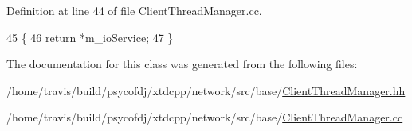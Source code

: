 Definition at line 44 of file Client\-Thread\-Manager.\-cc.


\begin{DoxyCode}
45 \{
46   \textcolor{keywordflow}{return} *m\_ioService;
47 \}
\end{DoxyCode}


The documentation for this class was generated from the following files\-:\begin{DoxyCompactItemize}
\item 
/home/travis/build/psycofdj/xtdcpp/network/src/base/\hyperlink{ClientThreadManager_8hh}{Client\-Thread\-Manager.\-hh}\item 
/home/travis/build/psycofdj/xtdcpp/network/src/base/\hyperlink{ClientThreadManager_8cc}{Client\-Thread\-Manager.\-cc}\end{DoxyCompactItemize}
